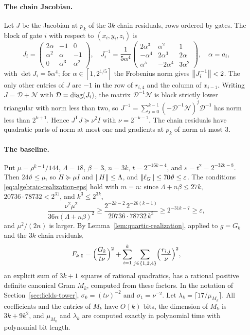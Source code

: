 \paragraph{The chain Jacobian.}
Let $J$ be the Jacobian at $p_k$ of the $3k$ chain residuals, rows ordered
by gates. The block of gate $i$ with respect to $(x_i,y_i,z_i)$ is
\[
 J_i=\begin{pmatrix}2\alpha&-1&0\\\alpha^2&\alpha&-1\\0&\alpha^3&\alpha^2\end{pmatrix},
 \quad
 J_i^{-1}=\frac1{5\alpha^4}\begin{pmatrix}
 2\alpha^3&\alpha^2&1\\-\alpha^4&2\alpha^3&2\alpha\\\alpha^5&-2\alpha^4&3\alpha^2
 \end{pmatrix},\quad\alpha=a_i,
\]
with $\det J_i=5\alpha^4$; for $\alpha\in[1,2^{1/5}]$ the Frobenius norm gives
$\left\lVert J_i^{-1}\right\rVert<2$. The only other entries of $J$ are $-1$ in the row of
$r_{i,4}$ and the column of $x_{i-1}$. Writing $J=\mathcal D+\mathcal N$
with $\mathcal D=\operatorname{diag}(J_i)$, the matrix $\mathcal D^{-1}\mathcal N$ is
block strictly lower triangular with norm less than two, so
$J^{-1}=\sum_{j=0}^{k-1}(-\mathcal D^{-1}\mathcal N)^j\mathcal D^{-1}$ has
norm less than $2^{k+1}$. Hence $J^{\mathsf T}J\succeq\nu^2I$ with
$\nu=2^{-k-1}$. The chain residuals have quadratic parts of norm at most one
and gradients at $p_k$ of norm at most $3$.

\paragraph{The baseline.}
Put $\mu=\rho^{k-1}/144$, $\Lambda=18$, $\beta=3$, $n=3k$, $t=2^{-16k-4}$, and
$\varepsilon=t^2=2^{-32k-8}$. Then $24\vartheta\le\mu$, so $H\succeq\mu I$
and $\left\lVert H\right\rVert\le\Lambda$, and $\left\lVert\ell_G\right\rVert\le70\vartheta\le\varepsilon$. The
conditions \eqref{eq:algebraic-realization-eps} hold with $m=n$: since
$\Lambda+n\beta\le27k$, $20736\cdot78732<2^{31}$, and $k^3\le2^{3k}$,
\[
 \frac{\nu^2\mu^2}{36n(\Lambda+n\beta)^2}\ge
 \frac{2^{-2k-2}\,2^{-26(k-1)}}{20736\cdot78732\,k^3}
 \ge2^{-31k-7}\ge\varepsilon,
\]
and $\mu^2/(2n)$ is larger. By Lemma~\ref{lem:quartic-realization},
applied to $g=G_k$ and the $3k$ chain residuals,
\[
 F_{k,0}=\Bigl(\frac{G_k}{t\nu}\Bigr)^2
   +\sum_{i=1}^k\sum_{j\in\{1,2,4\}}\Bigl(\frac{r_{i,j}}\nu\Bigr)^2,
\]
an explicit sum of $3k+1$ squares of rational quadratics, has a rational
positive definite canonical Gram $M_k$, computed from these factors. In the
notation of Section~\ref{sec:fields-tower}, $\sigma_0=(t\nu)^{-2}$ and
$\sigma_1=\nu^{-2}$. Let
$\lambda_k=\lceil17/\mu_{M_k}\rceil$. All coefficients and the entries of
$M_k$ have $O(k)$ bits, the dimension of $M_k$ is $3k+9k^2$, and
$\mu_{M_k}$ and $\lambda_k$ are computed exactly in polynomial time with
polynomial bit length.

